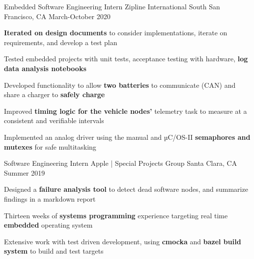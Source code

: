 

\begin{cventries}

  
  \cventry
    {Embedded Software Engineering Intern} %
    {Zipline International} %
    {South San Francisco, CA} %
    {March-October 2020} %
    {
      \begin{cvitems} %
        \item {\textbf{Iterated on design documents} to consider implementations, iterate on requirements, and develop a test plan}
        \item {Tested embedded projects with unit tests, acceptance testing with hardware, \textbf{log data analysis notebooks}}
        \item {Developed functionality to allow \textbf{two batteries} to communicate (CAN) and share a charger to \textbf{safely charge}}
        \item {Improved \textbf{timing logic for the vehicle nodes'} telemetry task to measure at a consistent and verifiable intervals}
        \item {Implemented an analog driver using the manual and µC/OS-II 
       \textbf{semaphores and mutexes} for safe multitasking}
      \end{cvitems}
    }

  \cventry
    {Software Engineering Intern} %
    {Apple | Special Projects Group} %
    {Santa Clara, CA} %
    {Summer 2019} %
    {
      \begin{cvitems} %
      \item {Designed a \textbf{failure analysis tool} to detect dead software nodes, and summarize findings in a markdown report}
      \item {Thirteen weeks of \textbf{systems programming} experience targeting real time \textbf{embedded} operating system}
      \item {Extensive work with test driven development, using \textbf{cmocka} and \textbf{bazel build system} to build and test targets}
      \end{cvitems}
    }


\end{cventries}
